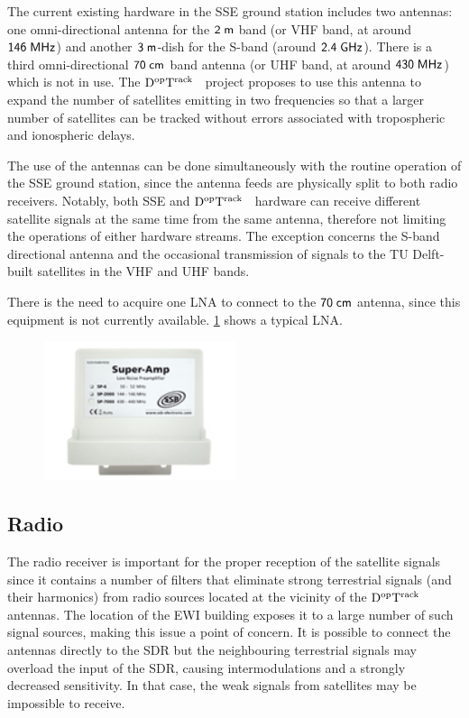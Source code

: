 \documentclass[11pt,a4paper,oneside]{article}
\newcommand{\GroundStationName}{${\rm D^{\rm op}T^{\rm rack}}$}
\newcommand{\halftextwidth}{0.5\textwidth}
\newcommand{\unit}[2]{$ {\sf #1}\thickspace{\sf #2}$}
\begin{document}
The current existing hardware in the \ac{SSE} ground station includes two antennas: one omni-directional antenna for the \unit{2}{m} band (or \ac{VHF} band, at around \unit{146}{MHz}) and another \unit{3}{m}-dish for the S-band (around \unit{2.4}{GHz}). There is a third omni-directional \unit{70}{cm} band antenna (or \ac{UHF} band, at around \unit{430}{MHz}) which is not in use. The \GroundStationName~ project proposes to use this antenna to expand the number of satellites emitting in two frequencies so that a larger number of satellites can be tracked without errors associated with tropospheric and ionospheric delays.

The use of the antennas can be done simultaneously with the routine operation of the \ac{SSE} ground station, since the antenna feeds are physically split to both radio receivers. Notably, both \ac{SSE} and \GroundStationName~ hardware can receive different satellite signals at the same time from the same antenna, therefore not limiting the operations of either hardware streams. The exception concerns the S-band directional antenna and the occasional transmission of signals to the TU Delft-built satellites in the \ac{VHF} and \ac{UHF} bands.

There is the need to acquire one \ac{LNA} to connect to the \unit{70}{cm} antenna, since this equipment is not currently available. \ref{fig:lna} shows a typical \ac{LNA}.

\begin{figure}[!ht]
\centering
\includegraphics[width=\halftextwidth]{LNA}
\caption{\modellna}
\label{fig:lna}
\end{figure}



\subsection{Radio}

The radio receiver is important for the proper reception of the satellite signals since it contains a number of filters that eliminate strong terrestrial signals (and their harmonics) from radio sources located at the vicinity of the \GroundStationName~ antennas. The location of the \ac{EWI} building exposes it to a large number of such signal sources, making this issue a point of concern. It is possible to connect the antennas directly to the \ac{SDR} but the neighbouring terrestrial signals may overload the input of the \ac{SDR}, causing intermodulations and a strongly decreased sensitivity. In that case, the weak signals from satellites may be impossible to receive.
\end{document}
